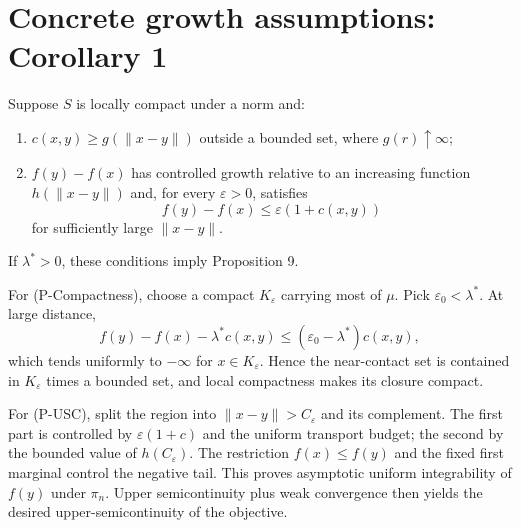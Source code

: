 \section{Concrete growth assumptions: Corollary 1}
Suppose $S$ is locally compact under a norm and:
\begin{enumerate}[label=(A\arabic*),start=3]
\item $c(x,y)\ge g(\|x-y\|)$ outside a bounded set, where $g(r)\uparrow\infty$;
\item $f(y)-f(x)$ has controlled growth relative to an increasing function $h(\|x-y\|)$ and,
for every $\varepsilon>0$, satisfies
\[
 f(y)-f(x)\le\varepsilon(1+c(x,y))
\]
for sufficiently large $\|x-y\|$.
\end{enumerate}
If $\lambda^*>0$, these conditions imply Proposition 9.

For (P-Compactness), choose a compact $K_\varepsilon$ carrying most of $\mu$.  Pick
$\varepsilon_0<\lambda^*$.  At large distance,
\[
 f(y)-f(x)-\lambda^*c(x,y)
 \le(\varepsilon_0-\lambda^*)c(x,y),
\]
which tends uniformly to $-\infty$ for $x\in K_\varepsilon$.  Hence the near-contact set is contained
in $K_\varepsilon$ times a bounded set, and local compactness makes its closure compact.

For (P-USC), split the region into $\|x-y\|>C_\varepsilon$ and its complement.  The first part is
controlled by $\varepsilon(1+c)$ and the uniform transport budget; the second by the bounded value
of $h(C_\varepsilon)$.  The restriction $f(x)\le f(y)$ and the fixed first marginal control the
negative tail.  This proves asymptotic uniform integrability of $f(y)$ under $\pi_n$.  Upper
semicontinuity plus weak convergence then yields the desired upper-semicontinuity of the objective.

